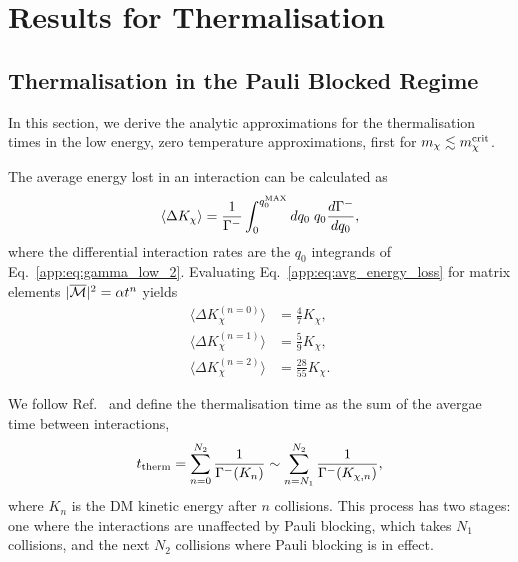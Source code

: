 \chapter{Results for Thermalisation}
\label{appendix:thermalisation_results}


\section{Thermalisation in the Pauli Blocked Regime}
\label{app:sec:pauliblockingle}
In this section, we derive the analytic approximations for the thermalisation times in the low energy, zero temperature approximations, first for $m_\chi\lesssim m_\chi^{\rm crit}$.

The average energy lost in an interaction can be calculated as
\begin{equation}
    \langle \Delta K_\chi \rangle = \frac{1}{\Gamma^-}\int_0^{q_0^{\rm MAX}} dq_0\; q_0 \frac{d \Gamma^-}{d q_0},
    \label{app:eq:avg_energy_loss}
\end{equation}
where the differential interaction rates are the $q_0$ integrands of Eq.~\ref{app:eq:gamma_low_2}. Evaluating Eq.~\ref{app:eq:avg_energy_loss} for matrix elements $|\overline{\mathcal M}|^2 = \alpha t^n$ yields
\begin{align}
    \langle \Delta K_\chi^{ (n = 0)} \rangle & = \frac{4}{7}K_\chi,\\
    \langle \Delta K_\chi^{ (n = 1)} \rangle & = \frac{5}{9}K_\chi,\\
    \langle \Delta K_\chi^{ (n = 2)} \rangle & = \frac{28}{55}K_\chi.
\end{align}

We follow Ref.~\cite{Bertoni:2013bsa_dec_DarkMatterThermalization} and define the thermalisation time as the sum of the avergae time between interactions, 
\begin{equation}
    t_{\rm therm} = \sum_{n=0}^{N_2} \frac{1}{\Gamma^-(K_{n})} \sim \sum_{n=N_1}^{N_2} \frac{1}{\Gamma^-(K_{\chi, n})},
    \label{app:eq:therm_time_defn}
\end{equation}
where $K_{n}$ is the DM kinetic energy after $n$ collisions. 
This process has two stages: one where the interactions are unaffected by Pauli blocking, which takes $N_1$ collisions, and the next $N_2$ collisions where Pauli blocking is in effect. 

